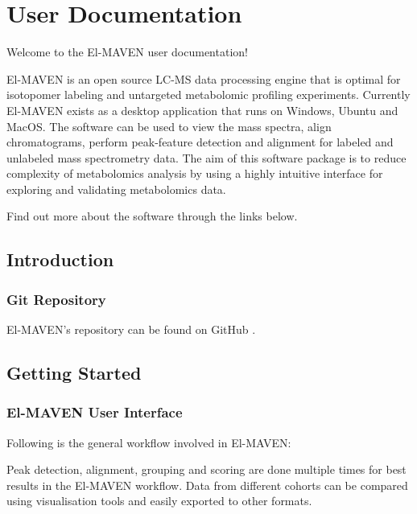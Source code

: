 \documentclass[letterpaper,10pt,english,openany,oneside]{sphinxmanual}
\begin{document}
\section{User Documentation}
\label{\detokenize{Documentation:user-documentation}}\label{\detokenize{Documentation::doc}}
Welcome to the El-MAVEN user documentation!

El-MAVEN is an open source LC-MS data processing engine that is optimal for isotopomer labeling and untargeted metabolomic profiling experiments. Currently El-MAVEN exists as a desktop application that runs on Windows, Ubuntu and MacOS. The software can be used to view the mass spectra, align chromatograms, perform peak-feature detection and alignment for labeled and unlabeled mass spectrometry data. The aim of this software package is to reduce complexity of metabolomics analysis by using a highly intuitive interface for exploring and validating metabolomics data.

Find out more about the software through the links below.


\subsection{Introduction}
\label{\detokenize{Documentation:introduction}}

\subsubsection{Git Repository}
\label{\detokenize{GitRepository:git-repository}}\label{\detokenize{GitRepository::doc}}
El-MAVEN’s repository can be found on GitHub .


\subsection{Getting Started}
\label{\detokenize{Documentation:getting-started}}

\subsubsection{El-MAVEN User Interface}
\label{\detokenize{IntroductiontoElMAVENUI:el-maven-user-interface}}\label{\detokenize{IntroductiontoElMAVENUI::doc}}
Following is the general workflow involved in El-MAVEN:

\noindent{}

Peak detection, alignment, grouping and scoring are done multiple times for best results in the El-MAVEN workflow. Data from different cohorts can be compared using visualisation tools and easily exported to other formats.
\end{document}
